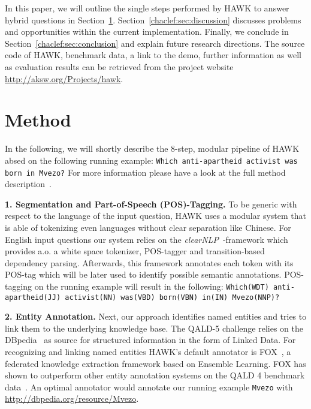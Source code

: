In this paper, we will outline the single steps performed by HAWK to answer hybrid questions in Section~\ref{chaclef:sec:method}.
Section~\ref{chaclef:sec:discussion} discusses problems and opportunities within the current implementation.
Finally, we conclude in Section~\ref{chaclef:sec:conclusion} and explain future research directions.
The source code of HAWK, benchmark data, a link to the demo, further information as well as evaluation results can be retrieved from the project website \url{http://aksw.org/Projects/hawk}.


\section{Method}
\label{chaclef:sec:method}

In the following, we will shortly describe the 8-step, modular pipeline of HAWK absed on the following running example: \texttt{Which anti-apartheid activist was born in Mvezo?}
For more information please have a look at the full method description~\cite{hawk_2015}.


\textbf{1. Segmentation and Part-of-Speech (POS)-Tagging.} 
To be generic with respect to the language of the input question, HAWK uses a modular system that is able of tokenizing even languages without clear separation like Chinese.
For English input questions our system relies on the \emph{clearNLP}~\cite{choi2011getting}-framework which provides a.o. a white space tokenizer, POS-tagger and transition-based dependency parsing.
Afterwards, this framework annotates each token with its POS-tag which will be later used to identify possible semantic annotations. 
POS-tagging on the running example will result in the following: \texttt{Which(WDT) anti-apartheid(JJ) activist(NN) was(VBD) born(VBN) in(IN) Mvezo(NNP)?}

\textbf{2. Entity Annotation.} 
Next, our approach identifies named entities and tries to link them to the underlying knowledge base. 
The QALD-5 challenge relies on the DBpedia~\cite{jl_2014/swj_dbpedia} as source for structured information in the form of Linked Data. 
For recognizing and linking named entities HAWK's default annotator is FOX~\cite{FOX}, a federated knowledge extraction framework based on Ensemble Learning. 
FOX has shown to outperform other entity annotation systems on the QALD 4 benchmark data~\cite{hawk_2015}.
An optimal annotator would annotate our running example \texttt{Mvezo} with \url{http://dbpedia.org/resource/Mvezo}.

